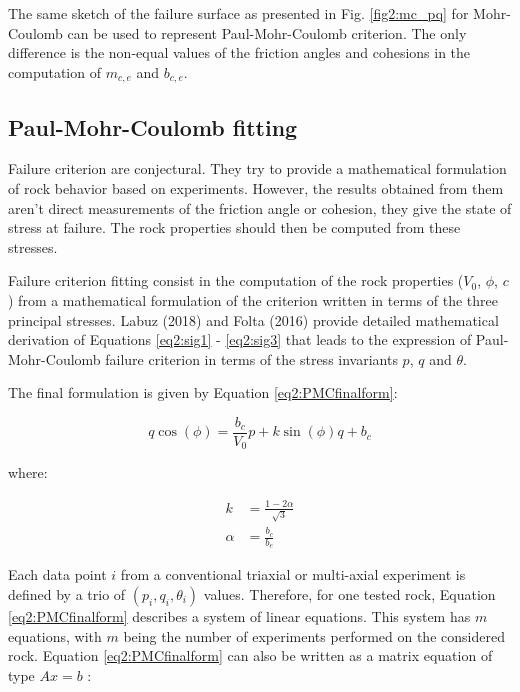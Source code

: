 The same sketch of the failure surface as presented in Fig. \ref{fig2:mc_pq} for Mohr-Coulomb can be used to represent Paul-Mohr-Coulomb criterion. The only difference is the non-equal values of the friction angles and cohesions in the computation of $m_{c,e}$ and $b_{c,e}$.

\subsection{Paul-Mohr-Coulomb fitting }\label{ch2:pmcfit}

Failure criterion are conjectural. They try to provide a mathematical formulation of rock behavior based on experiments. However, the results obtained from them aren’t direct measurements of the friction angle or cohesion, they give the state of stress at failure. The rock properties should then be computed from these stresses.

Failure criterion fitting consist in the computation of the rock properties ($V_0$, $\phi$, $c$ ) from a mathematical formulation of the criterion written in terms of the three principal stresses. Labuz (2018) \cite{Labuz2018} and Folta (2016) \cite{Folta2016} provide detailed mathematical derivation of Equations \ref{eq2:sig1} - \ref{eq2:sig3} that leads to the expression of Paul-Mohr-Coulomb failure criterion in terms of the stress invariants $p$, $q$  and $\theta$. 

The final formulation is given by Equation \ref{eq2:PMCfinalform}:

\begin{equation}\label{eq2:PMCfinalform}
    q\cos(\phi) = \frac{b_c}{V_0}p+k\sin(\phi)q+b_c
\end{equation}

where:

\begin{align}
    k &= \frac{1-2\alpha }{\sqrt{3}}\\
    \alpha &= \frac{b_c}{b_e}
\end{align}

Each data point $i$ from a conventional triaxial or multi-axial experiment is defined by a trio of $(p_i,q_i,\theta_i)$ values. Therefore, for one tested rock, Equation \ref{eq2:PMCfinalform} describes a system of linear equations. This system has $m$  equations, with $m$ being the number of experiments performed on the considered rock. Equation \ref{eq2:PMCfinalform} can also be written as a matrix equation of type $Ax=b$ :

